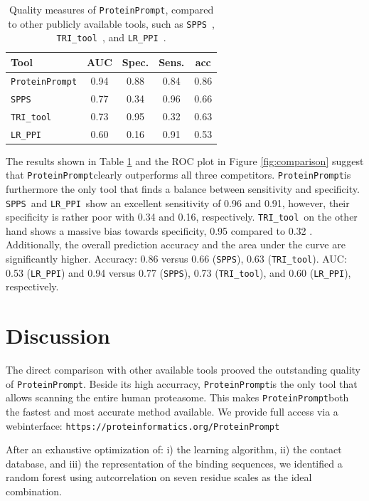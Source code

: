 \documentclass[preprint,3p,times,twocolumn]{elsarticle}
\newcommand{\url}[1]{\texttt{https://\small #1}}
\newcommand{\spps}{\texttt{SPPS}}
\newcommand{\tri}{\texttt{TRI\_tool}}
\newcommand{\lr}{\texttt{LR\_PPI}}
\newcommand{\tool}{\texttt{ProteinPrompt}\hspace{2pt}}
\newcommand{\website}{\url{proteinformatics.org/\tool}}
\begin{document}
\begin{table}
\begin{tabular}{|l |c | c | c | c |}
  \hline
  Tool  & AUC & Spec. & Sens. & acc \\
  \hline
  \tool  & 0.94 & 0.88 & 0.84 &  0.86 \\
  \hline
  \spps\  & 0.77 & 0.34 & 0.96 & 0.66 \\
  \hline
  \tri\  & 0.73 & 0.95 & 0.32 & 0.63 \\
  \hline
  \lr\  & 0.60 & 0.16 & 0.91 & 0.53  \\
  \hline
\end{tabular}
\caption{ Quality measures of \tool, compared to other publicly
  available tools, such as \spps\ \cite{Liu:2012}, \tri\
  \cite{Perovic:2017}, and \lr\ \cite{Pan:2010}. }
\label{table:comparison}
\end{table}

The results shown in Table \ref{table:comparison} and the ROC plot in
Figure \ref{fig:comparison} suggest that \tool clearly outperforms all
three competitors. \tool is furthermore the only tool that finds a
balance between sensitivity and specificity. \spps\ and \lr\ show an
excellent sensitivity of 0.96 and 0.91, however, their
specificity is rather poor with 0.34 and 0.16, respectively. \tri\ on
the other hand shows a massive bias towards specificity, 0.95 compared
to 0.32 .
Additionally, the overall prediction accuracy and the area under the curve are significantly higher.
Accuracy: 0.86 versus 0.66 (\spps), 0.63 (\tri).
AUC: 0.53 (\lr) and 0.94 versus 0.77 (\spps), 0.73 (\tri), and 0.60 (\lr), respectively.


\section{Discussion}

The direct comparison with other available tools prooved the
outstanding quality of \tool. Beside its high accurracy, \tool is the
only tool that allows scanning the entire human proteasome. This makes
\tool both the fastest and most accurate method available. We provide
full access via a webinterface: \website

After an exhaustive optimization of: i) the learning algorithm, ii)
the contact database, and iii) the representation of the binding
sequences, we identified a random forest using autcorrelation on seven
residue scales as the ideal combination.
\end{document}
